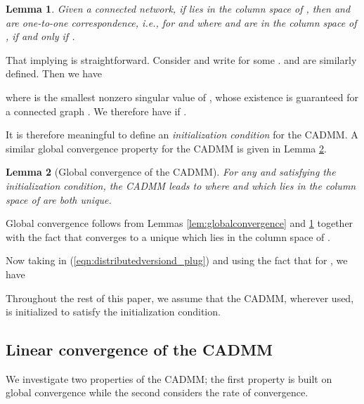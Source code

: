 \documentclass[journal]{IEEEtran}
\newtheorem{lemma}{Lemma}
\begin{document}
\begin{lemma}
\label{lem:abrelation}
Given a connected network, if  lies in the column space of , then  and  are one-to-one correspondence, i.e., for  and  where  and  are in the column space of ,  if and only if .
\end{lemma}
\begin{IEEEproof}
That  implying  is straightforward. Consider  and write   for some .  and  are similarly defined. Then we have 

where  is the smallest nonzero singular value of , whose existence is guaranteed for a connected graph \cite{ChungSpectral}. We therefore have  if .
\end{IEEEproof}

It is therefore meaningful to define an \emph{initialization condition} for the CADMM. A similar global convergence property for the CADMM is given in Lemma \ref{lem:linearconvergence_DCADMM}.
\begin{center}
{}
\end{center}

\begin{lemma}[Global convergence of the CADMM]
\label{lem:linearconvergence_DCADMM}
For any  and  satisfying the initialization condition, the CADMM leads to 
where  and  which lies in the column space of  are both unique.
\end{lemma}
\begin{IEEEproof}
Global convergence follows from Lemmas \ref{lem:globalconvergence} and \ref{lem:abrelation} together with the fact that  converges to a unique  which lies in the column space of .

Now taking  in (\ref{eqn:distributedversiond_plug}) and using the fact that  for , we have 
\end{IEEEproof}


Throughout the rest of this paper, we assume that the CADMM, wherever used, is initialized to satisfy the initialization condition.

\subsection{Linear convergence of the CADMM}
\label{sec:LCofDCADMM}
We investigate two properties of the CADMM; the first property is built on global convergence while the second considers the rate of convergence. 
\end{document}
